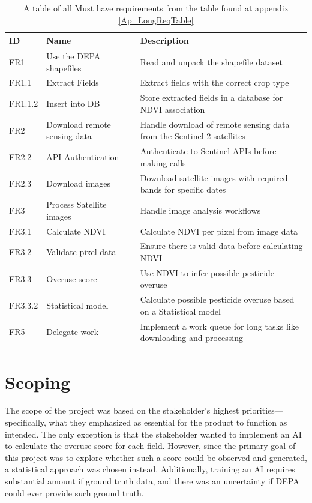 \begin{table}[H]
    \centering
    \begin{tabular}{|p{1.2cm}|p{6cm}|p{6cm}|}
    \hline
    \textbf{ID} & \textbf{Name} & \textbf{Description}\\
    \hline
    FR1 & Use the DEPA shapefiles & Read and unpack the shapefile dataset\\
    \hline
    FR1.1 & Extract Fields & Extract fields with the correct crop type \\
    \hline
    FR1.1.2 & Insert into DB & Store extracted fields in a database for NDVI association\\
    \hline
    FR2 & Download remote sensing data & Handle download of remote sensing data from the Sentinel-2 satellites\\
    \hline
    FR2.2 & API Authentication & Authenticate to Sentinel APIs before making calls \\
    \hline
    FR2.3 & Download images & Download satellite images with required bands for specific dates\\
    \hline
    FR3 & Process Satellite images & Handle image analysis workflows  \\
    \hline
    FR3.1 & Calculate NDVI & Calculate NDVI per pixel from image data  \\
    \hline
    FR3.2 & Validate pixel data & Ensure there is valid data before calculating NDVI \\
    \hline
    FR3.3 & Overuse score & Use NDVI to infer possible pesticide overuse  \\
    \hline
    FR3.3.2 & Statistical model & Calculate possible pesticide overuse based on a Statistical model \\
    \hline
    FR5 & Delegate work & Implement a work queue for long tasks like downloading and processing \\
    \hline
    \end{tabular}
    \caption{A table of all Must have requirements from the table found at appendix \ref{Ap_LongReqTable}}
    \label{mustReqTable}
\end{table}


\section{Scoping}\label{SE_Scoping}
The scope of the project was based on the stakeholder’s highest priorities—specifically, what they emphasized as essential for the product to function as intended. The only exception is that the stakeholder wanted to implement an \acrshort{AI} to calculate the overuse score for each field. However, since the primary goal of this project was to explore whether such a score could be observed and generated, a statistical approach was chosen instead.  Additionally, training an AI requires substantial amount if ground truth data, and there was an uncertainty if \acrshort{DEPA} could ever provide such ground truth.

